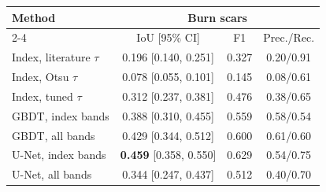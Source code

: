 \begin{tabular}{@{}lccc@{}}
\toprule
Method & \multicolumn{3}{c}{Burn scars} \\
\cmidrule(lr){2-4}
 & IoU [95\% CI] & F1 & Prec./Rec. \\
\midrule
Index, literature $\tau$ & 0.196 {\scriptsize[0.140, 0.251]} & 0.327 & 0.20/0.91 \\
Index, Otsu $\tau$ & 0.078 {\scriptsize[0.055, 0.101]} & 0.145 & 0.08/0.61 \\
Index, tuned $\tau$ & 0.312 {\scriptsize[0.237, 0.381]} & 0.476 & 0.38/0.65 \\
\midrule
GBDT, index bands & 0.388 {\scriptsize[0.310, 0.455]} & 0.559 & 0.58/0.54 \\
GBDT, all bands & 0.429 {\scriptsize[0.344, 0.512]} & 0.600 & 0.61/0.60 \\
U-Net, index bands & \textbf{0.459} {\scriptsize[0.358, 0.550]} & 0.629 & 0.54/0.75 \\
U-Net, all bands & 0.344 {\scriptsize[0.247, 0.437]} & 0.512 & 0.40/0.70 \\
\bottomrule
\end{tabular}